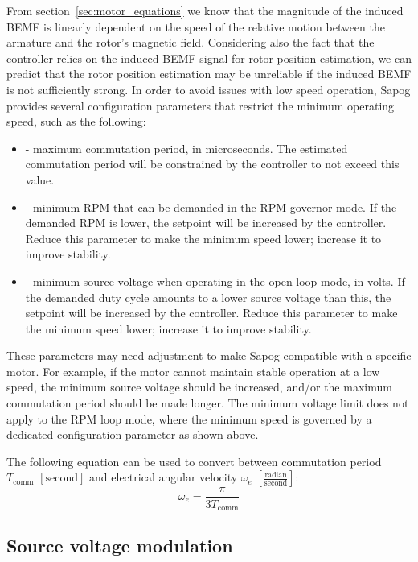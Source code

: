 \documentclass{zubaxdoc}
\begin{document}
From section~\ref{sec:motor_equations} we know that the magnitude of the induced BEMF is linearly
dependent on the speed of the relative motion between the armature and the rotor's magnetic field.
Considering also the fact that the controller relies on the induced BEMF signal for rotor position estimation,
we can predict that the rotor position estimation may be unreliable if the induced BEMF is not sufficiently
strong.
In order to avoid issues with low speed operation, Sapog provides several configuration parameters that
restrict the minimum operating speed, such as the following:

\begin{itemize}
	\item {} - maximum commutation period, in microseconds.
	The estimated commutation period will be constrained by the controller to not exceed this value.
	\item {} - minimum RPM that can be demanded in the RPM governor mode.
	If the demanded RPM is lower, the setpoint will be increased by the controller.
	Reduce this parameter to make the minimum speed lower; increase it to improve stability.
	\item {} - minimum source voltage when operating in the open loop mode, in volts.
	If the demanded duty cycle amounts to a lower source voltage than this, the setpoint will be
	increased by the controller.
	Reduce this parameter to make the minimum speed lower; increase it to improve stability.
\end{itemize}

These parameters may need adjustment to make Sapog compatible with a specific motor.
For example, if the motor cannot maintain stable operation at a low speed,
the minimum source voltage should be increased,
and/or the maximum commutation period should be made longer.
The minimum voltage limit does not apply to the RPM loop mode,
where the minimum speed is governed by a dedicated configuration parameter as shown above.

The following equation can be used to convert between commutation period $T_\text{comm}$
$\left[\text{second}\right]$
and electrical angular velocity $\omega_e$ $\left[\frac{\text{radian}}{\text{second}}\right]$:
\begin{equation}
	\omega_e = \frac{\pi}{3 T_\text{comm}}
\end{equation}

\subsection{Source voltage modulation}
\end{document}
